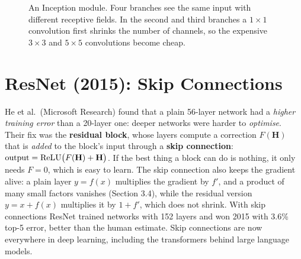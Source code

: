 \documentclass[12pt, a4paper]{article}
\providecommand{\bH}{\mathbf{H}}
\begin{document}
\begin{figure}[H]
  \centering
  \caption{An Inception module. Four branches see the same input with
    different receptive fields. In the second and third branches a
    $1 \times 1$ convolution first shrinks the number of channels, so the
    expensive $3\times3$ and $5\times5$ convolutions become cheap.}
  \label{fig:inception}
\end{figure}

\section{ResNet (2015): Skip Connections}

He et al.\ (Microsoft Research) found that a plain 56-layer network had a
\emph{higher training error} than a 20-layer one: deeper networks were harder
to \emph{optimise}. Their fix was the \textbf{residual block}, whose layers
compute a correction $F(\bH)$ that is \emph{added} to the block's input
through a \textbf{skip connection}: $\text{output} = \relu\bigl(F(\bH) +
  \bH\bigr)$. If the best thing a block can do is nothing, it only needs
$F = 0$, which is easy to learn. The skip connection also keeps the gradient
alive: a plain layer $y = f(x)$ multiplies the gradient by $f'$, and a product
of many small factors vanishes (Section 3.4), while the residual version
$y = x + f(x)$ multiplies it by $1 + f'$, which does not shrink. With skip
connections ResNet trained networks with 152 layers and won 2015 with 3.6\%
top-5 error, better than the human estimate. Skip connections are now
everywhere in deep learning, including the transformers behind large language
models.
\end{document}
